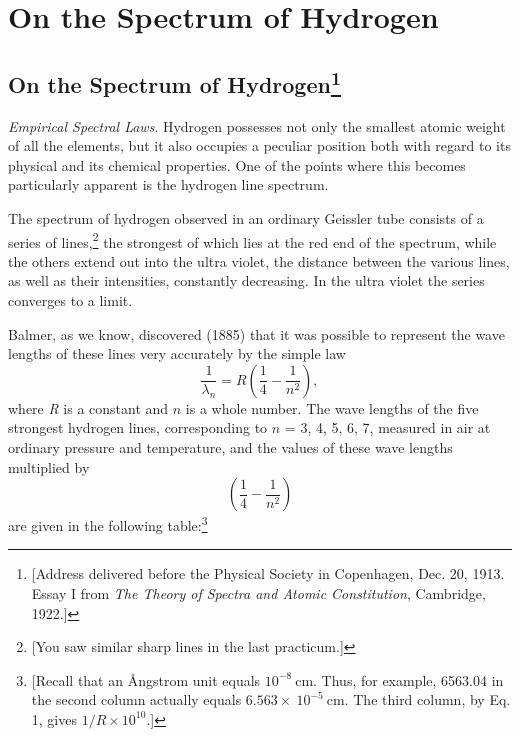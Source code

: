 \chapter{On the Spectrum of Hydrogen}


\renewcommand{\theequation}{\arabic{equation}}

\section*{On the Spectrum of Hydrogen\footnote{{[}Address delivered before the
  Physical Society in Copenhagen, Dec. 20, 1913. Essay I from \emph{The
  Theory of Spectra and Atomic Constitution}, Cambridge, 1922.{]}}}

\emph{Empirical Spectral Laws}. Hydrogen possesses not only the smallest
atomic weight of all the elements, but it also occupies a peculiar
position both with regard to its physical and its chemical properties.
One of the points where this becomes particularly apparent is the
hydrogen line spectrum.

The spectrum of hydrogen observed in an ordinary Geissler tube consists
of a series of lines,\footnote{{[}You saw similar sharp lines in the
  last practicum.{]}} the strongest of which lies at the red end of the
spectrum, while the others extend out into the ultra violet, the
distance between the various lines, as well as their intensities,
constantly decreasing. In the ultra violet the series converges to a
limit.

Balmer, as we know, discovered (1885) that it was possible to represent
the wave lengths of these lines very accurately by the simple law
%
\begin{equation}
\frac{1}{\lambda_n} = R\left(\frac{1}{4} - \frac{1}{n^2}\right) ,
\end{equation}
%
where \emph{R} is a constant and $n$ is a whole number. The wave
lengths of the five strongest hydrogen lines, corresponding to $n$
= 3, 4, 5, 6, 7, measured in air at ordinary pressure and temperature,
and the values of these wave lengths multiplied by
%
\begin{equation*}
\left(\frac{1}{4} - \frac{1}{n^2}\right)
\end{equation*}
%
are given in the following table:\footnote{{[}Recall that an Ångstrom
  unit equals $10^{-8}\ \text{cm}$. Thus, for example, 6563.04 in the second column
  actually equals $6.563 \times\  10^{-5}\ \text{cm}$. The third column,
  by Eq. 1, gives $1/R \times 10^{10}$.{]}}

